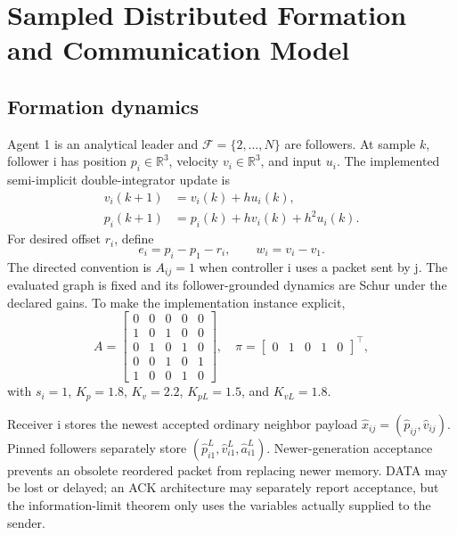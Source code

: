 \documentclass[10pt,twocolumn,twoside]{IEEEtran}
\begin{document}
\section{Sampled Distributed Formation and Communication Model}

\subsection{Formation dynamics}

Agent 1 is an analytical leader and
\(\mathcal F=\{2,\ldots,N\}\) are followers.  At sample \(k\), follower i has
position \(p_i\in\mathbb R^3\), velocity \(v_i\in\mathbb R^3\), and input
\(u_i\).  The implemented semi-implicit double-integrator update is
\begin{align}
v_i(k+1)&=v_i(k)+hu_i(k),\\
p_i(k+1)&=p_i(k)+hv_i(k)+h^2u_i(k).
\end{align}
For desired offset \(r_i\), define
\begin{equation}
e_i=p_i-p_1-r_i,\qquad w_i=v_i-v_1.
\end{equation}
The directed convention is \(A_{ij}=1\) when controller i uses a packet sent
by j.  The evaluated graph is fixed and its follower-grounded dynamics are
Schur under the declared gains.  To make the implementation instance explicit,
\begin{equation}
A=\begin{bmatrix}
0&0&0&0&0\\1&0&1&0&0\\0&1&0&1&0\\
0&0&1&0&1\\1&0&0&1&0
\end{bmatrix},\quad
\pi=\begin{bmatrix}0&1&0&1&0\end{bmatrix}^{\!\top},
\label{eq:graph}
\end{equation}
with \(s_i=1\), \(K_p=1.8\), \(K_v=2.2\),
\(K_{pL}=1.5\), and \(K_{vL}=1.8\).

Receiver i stores the newest accepted ordinary neighbor payload
\(\hat x_{ij}=(\hat p_{ij},\hat v_{ij})\).  Pinned followers separately store
\((\hat p^L_{i1},\hat v^L_{i1},\hat a^L_{i1})\).  Newer-generation acceptance
prevents an obsolete reordered packet from replacing newer memory.  DATA may
be lost or delayed; an ACK architecture may separately report acceptance,
but the information-limit theorem only uses the variables actually supplied
to the sender.
\end{document}
